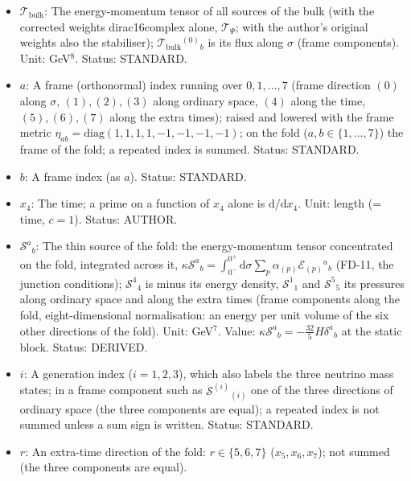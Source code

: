 \documentclass[
  10pt,
]{article}
\begin{document}
\begin{itemize}
  \(\kappa\): The eight-dimensional gravitational coupling,
  \(\kappa = 8\pi G_8\). Unit: GeV\(^{-6}\). Status: AUTHOR.
\item
  \(\mathcal{T}_{\mathrm{bulk}}\): The energy-momentum tensor of all
  sources of the bulk (with the corrected weights dirac16complex alone,
  \(\mathcal{T}_\Psi\); with the author's original weights also the
  stabiliser); \(\mathcal{T}_{\mathrm{bulk}}{}^{(0)}{}_b\) is its flux
  along \(\sigma\) (frame components). Unit: GeV\(^8\). Status:
  STANDARD.
\item
  \(a\): A frame (orthonormal) index running over \(0, 1, \dots, 7\)
  (frame direction \((0)\) along \(\sigma\), \((1), (2), (3)\) along
  ordinary space, \((4)\) along the time, \((5), (6), (7)\) along the
  extra times); raised and lowered with the frame metric
  \(\eta_{ab} = \mathrm{diag}(1, 1, 1, 1, -1, -1, -1, -1)\); on the fold
  (\(a, b \in \{1, \dots, 7\}\)) the frame of the fold; a repeated index
  is summed. Status: STANDARD.
\item
  \(b\): A frame index (as \(a\)). Status: STANDARD.
\item
  \(x_4\): The time; a prime on a function of \(x_4\) alone is
  \(\mathrm{d}/\mathrm{d}x_4\). Unit: length (= time, \(c = 1\)).
  Status: AUTHOR.
\item
  \(\mathcal{S}^a{}_b\): The thin source of the fold: the
  energy-momentum tensor concentrated on the fold, integrated across it,
  \(\kappa\mathcal{S}^a{}_b = \int_{0^-}^{0^+}\mathrm{d}\sigma\sum_p\alpha_{(p)}\mathcal{E}_{(p)}{}^a{}_b\)
  (FD-11, the junction conditions); \(\mathcal{S}^4{}_4\) is minus its
  energy density, \(\mathcal{S}^1{}_1\) and \(\mathcal{S}^5{}_5\) its
  pressures along ordinary space and along the extra times (frame
  components along the fold, eight-dimensional normalisation: an energy
  per unit volume of the six other directions of the fold). Unit:
  GeV\(^7\). Value:
  \(\kappa\mathcal{S}^a{}_b = -\frac{32}{5}H\delta^a{}_b\) at the static
  block. Status: DERIVED.
\item
  \(i\): A generation index (\(i = 1, 2, 3\)), which also labels the
  three neutrino mass states; in a frame component such as
  \(\mathcal{S}^{(i)}{}_{(i)}\) one of the three directions of ordinary
  space (the three components are equal); a repeated index is not summed
  unless a sum sign is written. Status: STANDARD.
\item
  \(r\): An extra-time direction of the fold: \(r \in \{5, 6, 7\}\)
  (\(x_5, x_6, x_7\)); not summed (the three components are equal).

\end{itemize}
\end{document}
